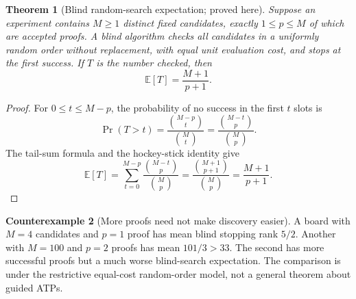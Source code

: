 \documentclass[11pt,letterpaper]{article}
\newtheorem{theorem}{Theorem}[section]
\theoremstyle{definition}
\newtheorem{counterexample}[theorem]{Counterexample}
\begin{document}
\begin{theorem}[Blind random-search expectation; proved here]\label{thm:blind}
Suppose an experiment contains $M\ge1$ distinct fixed candidates, exactly $1\le p\le M$ of which are accepted proofs. A blind algorithm checks all candidates in a uniformly random order without replacement, with equal unit evaluation cost, and stops at the first success. If $T$ is the number checked, then
\[
\boxed{\mathbb E[T]=\frac{M+1}{p+1}.}
\]
\end{theorem}
\begin{proof}
For $0\le t\le M-p$, the probability of no success in the first $t$ slots is
\[
\Pr(T>t)=\frac{\binom{M-p}{t}}{\binom Mt}=\frac{\binom{M-t}{p}}{\binom Mp}.
\]
The tail-sum formula and the hockey-stick identity give
\[
\mathbb E[T]=\sum_{t=0}^{M-p}\frac{\binom{M-t}{p}}{\binom Mp}
=\frac{\binom{M+1}{p+1}}{\binom Mp}=\frac{M+1}{p+1}.
\]
\end{proof}
\begin{counterexample}[More proofs need not make discovery easier]
A board with $M=4$ candidates and $p=1$ proof has mean blind stopping rank $5/2$. Another with $M=100$ and $p=2$ proofs has mean $101/3>33$. The second has more successful proofs but a much worse blind-search expectation. The comparison is under the restrictive equal-cost random-order model, not a general theorem about guided ATPs.
\end{counterexample}
\end{document}
